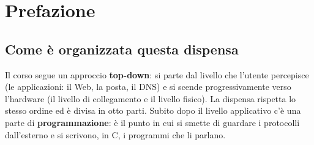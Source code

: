 \chapter{Prefazione}

\pagestyle{plain}

\section{Come è organizzata questa dispensa}

Il corso segue un approccio \textbf{top-down}: si parte dal livello che l'utente percepisce
(le applicazioni: il Web, la posta, il DNS) e si scende progressivamente verso l'hardware
(il livello di collegamento e il livello fisico). La dispensa rispetta lo stesso ordine ed è
divisa in otto parti. Subito dopo il livello applicativo c'è una parte di \textbf{programmazione}: è il punto in cui
si smette di guardare i protocolli dall'esterno e si scrivono, in C, i programmi che li parlano.

